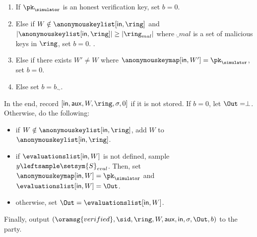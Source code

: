 \begin{tcolorbox}[left=2pt,right=2pt]
\begin{list}{\hspace*{1pt} C}{\setlength\leftmargin{0.15in}}
			\begin{enumerate}
				\item If   $ \pk_\simulator $ is an honest verification key, set $ b = 0 $. 
				\label{cond-main:forgery}
				
				\item Else if $ W \notin \anonymouskeylist[\msg,\ring] $ and $ |\anonymouskeylist[\msg, \ring]| \geq |\ring_{mal}| $ where $ \ring_{mal} $ is a set of malicious keys in $ \ring $, set $ b = 0 $.
				\label{cond-main:uniqueness}.
				
				\item Else if there exists $ W' \neq W $ where  $ \anonymouskeymap[\msg,W'] = \pk_\simulator $, set $ b = 0 $. \label{cond-main:differentWforsamepk} 
				\item Else set $ b = b_\sim$. \label{cond-main:simulatorbit}
			\end{enumerate}		
			
		\end{list}
		In the end,  record $ [\msg,\aux,W,\ring,\sigma, 0] $ if it is not stored. If $ b = 0 $, let $\Out = \perp $. Otherwise,   do the following:
		\begin{itemize}
			\item if $ W \notin \anonymouskeylist[\msg,\ring] $, add $ W $ to $ \anonymouskeylist[\msg,\ring]  $.
			\item if $ \evaluationslist[\msg,W] $ is not defined, sample $ y \leftsample \setsym{S}_{eval}$. Then, set $ \anonymouskeymap[\msg,W]  = \pk_\simulator$ and $ \evaluationslist[\msg, W] = \Out$.
			\item otherwise, set $ \Out = \evaluationslist[\msg, W]$. 	
		\end{itemize}
		Finally, output $(\oramsg{verified}, \sid, \ring,W, \aux,\msg, \sigma, \Out, b)$ to the party.
		

\end{tcolorbox}
